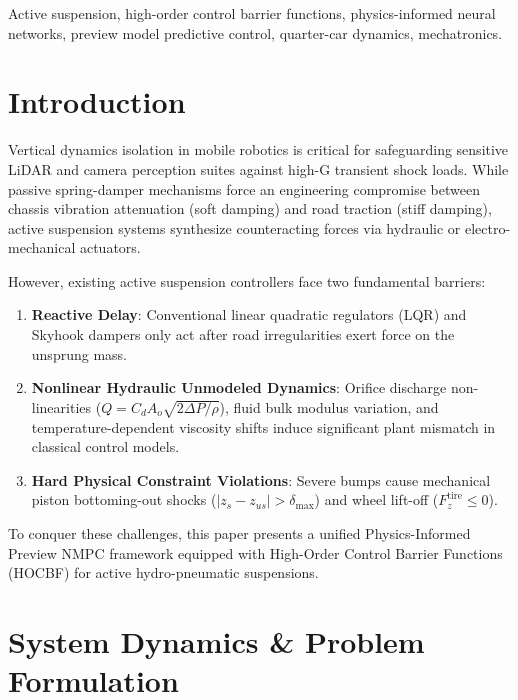 \documentclass[journal,twocolumn,letterpaper]{IEEEtran}
\begin{document}
\begin{IEEEkeywords}
Active suspension, high-order control barrier functions, physics-informed neural networks, preview model predictive control, quarter-car dynamics, mechatronics.
\end{IEEEkeywords}

\section{Introduction}
Vertical dynamics isolation in mobile robotics is critical for safeguarding sensitive LiDAR and camera perception suites against high-G transient shock loads. While passive spring-damper mechanisms force an engineering compromise between chassis vibration attenuation (soft damping) and road traction (stiff damping), active suspension systems synthesize counteracting forces via hydraulic or electro-mechanical actuators.

However, existing active suspension controllers face two fundamental barriers:
\begin{enumerate}
    \item \textbf{Reactive Delay}: Conventional linear quadratic regulators (LQR) and Skyhook dampers only act after road irregularities exert force on the unsprung mass.
    \item \textbf{Nonlinear Hydraulic Unmodeled Dynamics}: Orifice discharge non-linearities ($Q = C_d A_o \sqrt{2\Delta P/\rho}$), fluid bulk modulus variation, and temperature-dependent viscosity shifts induce significant plant mismatch in classical control models.
    \item \textbf{Hard Physical Constraint Violations}: Severe bumps cause mechanical piston bottoming-out shocks ($|z_s - z_{us}| > \delta_{\max}$) and wheel lift-off ($F_z^{\text{tire}} \le 0$).
\end{enumerate}

To conquer these challenges, this paper presents a unified Physics-Informed Preview NMPC framework equipped with High-Order Control Barrier Functions (HOCBF) for active hydro-pneumatic suspensions.

\section{System Dynamics \& Problem Formulation}
\end{document}
